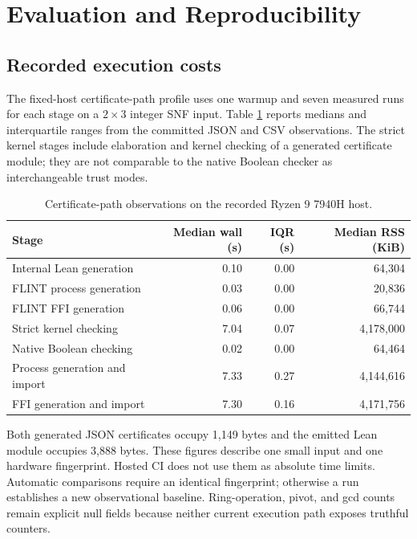 \section{Evaluation and Reproducibility}
\label{sec:evaluation}

\subsection{Recorded execution costs}

The fixed-host certificate-path profile uses one warmup and seven measured
runs for each stage on a \(2\times3\) integer SNF input. Table
\ref{tab:certificate-costs} reports medians and interquartile ranges from the
committed JSON and CSV observations. The strict kernel stages include
elaboration and kernel checking of a generated certificate module; they are
not comparable to the native Boolean checker as interchangeable trust modes.

\begin{table}[ht]
  \centering
  \small
  \begin{tabular}{lrrr}
    \toprule
    Stage & Median wall (s) & IQR (s) & Median RSS (KiB) \\
    \midrule
    Internal Lean generation & 0.10 & 0.00 & 64,304 \\
    FLINT process generation & 0.03 & 0.00 & 20,836 \\
    FLINT FFI generation & 0.06 & 0.00 & 66,744 \\
    Strict kernel checking & 7.04 & 0.07 & 4,178,000 \\
    Native Boolean checking & 0.02 & 0.00 & 64,464 \\
    Process generation and import & 7.33 & 0.27 & 4,144,616 \\
    FFI generation and import & 7.30 & 0.16 & 4,171,756 \\
    \bottomrule
  \end{tabular}
  \caption{Certificate-path observations on the recorded Ryzen 9 7940H host.}
  \label{tab:certificate-costs}
\end{table}

Both generated JSON certificates occupy 1,149 bytes and the emitted Lean
module occupies 3,888 bytes. These figures describe one small input and one
hardware fingerprint. Hosted CI does not use them as absolute time limits.
Automatic comparisons require an identical fingerprint; otherwise a run
establishes a new observational baseline. Ring-operation, pivot, and gcd
counts remain explicit null fields because neither current execution path
exposes truthful counters.

